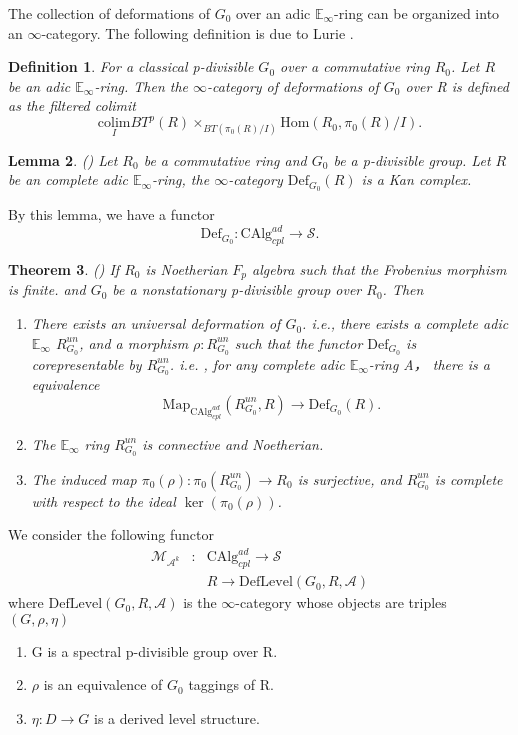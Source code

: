 \documentclass[12pt]{article}
\newtheorem{theorem}{Theorem}[section] %
\newtheorem{lemma}[theorem]{Lemma}
\theoremstyle{thry}
\newtheorem{definition}[theorem]{Definition}
\def  \colim    {\mathrm{colim}}
\def  \CAlg     {\mathrm{CAlg}}
\def  \Def      {\mathrm{Def}}
\def  \Hom      {\mathrm{Hom}}
\def  \Map      {\mathrm{Map}}
\def  \ca       {\mathcal{A}}
\def  \cm       {\mathcal{M}}
\def  \cs       {\mathcal{S}}
\def  \be       {\mathbb{E}}
\begin{document}
The collection of deformations  of $G_0$ over an adic $\be_{\infty}$-ring can be organized into an $\infty$-category. The following definition is due to Lurie \cite[Definition 3.1.4]{lu-EC2}.

\begin{definition}
	For a classical p-divisible $G_0$ over a commutative ring $R_0$. Let $R$ be an adic $\be_{\infty}$-ring. Then the $\infty$-category of deformations of $G_0$ over R is defined as the filtered colimit
	$$
	\underset{I}{\colim} BT^p(R) \times_{BT(\pi_0(R)/I)} \Hom(R_0, \pi_0(R)/I).
	$$
\end{definition}


\begin{lemma}(\cite[lemma 3.1.10]{lu-EC2})
	Let  $R_0$ be a commutative ring and $G_0$ be a p-divisible group. Let $R$ be  an complete adic $\be_{\infty}$-ring, the $\infty$-category $\Def_{G_0}(R)$ is a Kan complex.
\end{lemma}


By this lemma, we have a functor
$$
\Def_{G_0}:  \CAlg_{cpl}^{ad} \to \cs.
$$
\begin{theorem}(\cite[Theorem 3.1.15]{lu-EC2})
	If $R_0$ is Noetherian $F_p$ algebra such that the Frobenius morphism is finite. and $G_0$ be a nonstationary p-divisible group over $R_0$. Then
	\begin{enumerate}
		\item   There exists an universal deformation of $G_0$. i.e., there exists  a complete  adic $\be_{\infty}$ $R^{un}_{G_0}$, and a  morphism $\rho:  R^{un}_{G_0}$ such that the functor $\Def_{G_0}$ is corepresentable by $R^{un}_{G_0}$. i.e. , for any complete adic $\be_{\infty}$-ring A， there is a equivalence
		$$
		\Map_{\CAlg^{ad}_{cpl}}(R^{un}_{G_0},  R) \to \Def_{G_0}(R).
		$$
		
		\item The $\be_{\infty}$ ring $R^{un}_{G_0}$  is connective and Noetherian.
		
		\item The induced map $\pi_0 (\rho): \pi_0 (R^{un}_{G_0}) \to R_0$ is  surjective, and $R^{un}_{G_0}$ is complete with respect to the ideal $\ker(\pi_0 (\rho))$.
	\end{enumerate}
\end{theorem}




We consider the following functor
\begin{eqnarray*}
	\cm_{\ca^k} &: &\CAlg^{ad}_{cpl} \to \cs  \\
	&  & R \to  \mathrm{DefLevel}(G_0,R, \ca)
\end{eqnarray*}
where $\mathrm{DefLevel}(G_0,R, \ca)$ is  the $\infty$-category whose objects are triples $(G, \rho, \eta)$
\begin{enumerate}
	\item G is a  spectral p-divisible group over R.
	\item $\rho$ is an equivalence of $G_0$ taggings of R.
	\item $\eta:  D \to G $ is a derived level structure.
	
\end{enumerate}
\end{document}
